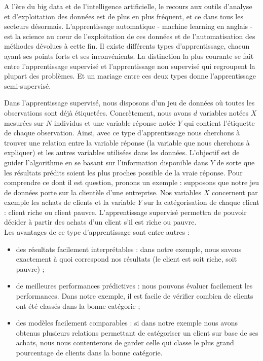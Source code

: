 \documentclass[12pt,a4paper]{book}
\newcommand{\1}{\mathds{1}}
\begin{document}
A l'ère du big data et de l'intelligence artificielle, le recours aux outils d'analyse et d'exploitation des données est de plus en plus fréquent, et ce dans tous les secteurs désormais. L'apprentissage automatique - machine learning en anglais - est la science au cœur de l'exploitation de ces données et de l'automatisation des méthodes dévolues à cette fin. Il existe différents types d'apprentissage, chacun ayant ses points forts et ses inconvénients. La distinction la plus courante se fait entre l'apprentissage supervisé et l'apprentissage non supervisé qui regroupent la plupart des problèmes. Et un mariage entre ces deux types donne l'apprentissage semi-supervisé. 

Dans l'apprentissage supervisé, nous disposons d'un jeu de données où toutes les observations sont déjà étiquetées. Concrètement, nous avons $d$ variables notées $X$ mesurées sur $N$ individus et une variable réponse notée $Y$ qui contient l'étiquette de chaque observation.   Ainsi, avec ce type d'apprentissage nous cherchons à trouver une relation entre la variable réponse (la variable que nous cherchons à expliquer) et les autres variables utilisées dans les données. L'objectif est de guider l'algorithme en se basant sur l'information disponible dans $Y$ de sorte que les résultats prédits soient les plus proches possible de la vraie réponse. Pour comprendre ce dont il est question, pronons un exemple : supposons que notre jeu de données porte sur la clientèle d'une entreprise. Nos variables $X$ concernent par exemple les achats de clients et la variable $Y$ sur la catégorisation de chaque client : client riche ou client pauvre. L'apprentissage supervisé permettra de pouvoir décider à partir des achats d'un client s'il est riche ou pauvre.\\ 
Les avantages de ce type d'apprentissage sont entre autres : 
\begin{itemize}
	\item des résultats facilement interprétables : dans notre exemple, nous savons exactement à quoi correspond nos résultats (le client est soit riche, soit pauvre) ;
	\item de meilleures performances prédictives : nous pouvons évaluer facilement les performances. Dans notre exemple, il est facile de vérifier combien de clients ont été classés dans la bonne catégorie ;
	\item des modèles facilement comparables : si dans notre exemple nous avons obtenus plusieurs relations permettant de catégoriser un client sur base de ses achats, nous nous contenterons de garder celle qui classe le plus grand pourcentage de clients dans la bonne catégorie.
\end{itemize}
\end{document}
